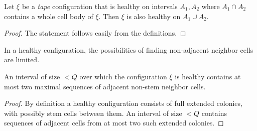 \documentclass[11pt]{memoir}
\theoremstyle{definition} %
\newtheorem{Premark}{\color{cyan}Peter remark}
\newenvironment{premark}{\begin{Premark}\color{cyan}}{\varqed\end{Premark}}
\def\B{B}
\newcommand{\Q}{Q} %
\begin{document}
\begin{lemma}\label{lem:health-extension}
  Let \( \xi \) be a \emph{tape} configuration that is healthy on intervals \( A_{1}, A_{2} \) 
where \( A_{1}\cap A_{2} \) contains a whole cell body of \( \xi \).
Then \( \xi \) is also healthy on \( A_{1}\cup A_{2} \).
\end{lemma}
\begin{proof}
  The statement follows easily from the definitions.
\end{proof}

In a healthy configuration, the possibilities of finding non-adjacent neighbor
cells are limited.

\begin{lemma}\label{lem:two-domains}
  An interval of size \( <\Q \) over which the configuration \( \xi \) is healthy
contains at most two maximal sequences of adjacent non-stem neighbor cells.
\end{lemma}
\begin{proof}
By definition a healthy configuration consists of full extended colonies, with 
possibly stem cells between them.
An interval of size \( <\Q \) contains sequences of adjacent cells 
from at most two such extended colonies.
\end{proof}




\end{document}
